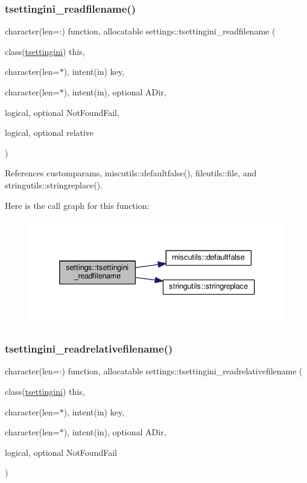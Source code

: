 \subsubsection{\texorpdfstring{tsettingini\+\_\+readfilename()}{tsettingini\_readfilename()}}
{\footnotesize\ttfamily character(len=\+:) function, allocatable settings\+::tsettingini\+\_\+readfilename (\begin{DoxyParamCaption}\item[{class(\mbox{\hyperlink{structsettings_1_1tsettingini}{tsettingini}})}]{this,  }\item[{character(len=$\ast$), intent(in)}]{key,  }\item[{character(len=$\ast$), intent(in), optional}]{A\+Dir,  }\item[{logical, optional}]{Not\+Found\+Fail,  }\item[{logical, optional}]{relative }\end{DoxyParamCaption})}



References customparams, miscutils\+::defaultfalse(), fileutils\+::file, and stringutils\+::stringreplace().

Here is the call graph for this function\+:
\nopagebreak
\begin{figure}[H]
\begin{center}
\leavevmode
\includegraphics[width=336pt]{namespacesettings_aa7bf4212045f11786b51f9cf5fe34ffb_cgraph}
\end{center}
\end{figure}
\mbox{\label{namespacesettings_a9fe4c031e947a169af96d96be88df87b}} 
\subsubsection{\texorpdfstring{tsettingini\+\_\+readrelativefilename()}{tsettingini\_readrelativefilename()}}
{\footnotesize\ttfamily character(len=\+:) function, allocatable settings\+::tsettingini\+\_\+readrelativefilename (\begin{DoxyParamCaption}\item[{class(\mbox{\hyperlink{structsettings_1_1tsettingini}{tsettingini}})}]{this,  }\item[{character(len=$\ast$), intent(in)}]{key,  }\item[{character(len=$\ast$), intent(in), optional}]{A\+Dir,  }\item[{logical, optional}]{Not\+Found\+Fail }\end{DoxyParamCaption})}

